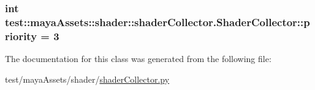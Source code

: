 \hypertarget{classtest_1_1mayaAssets_1_1shader_1_1shaderCollector_1_1ShaderCollector_a2a62ad7ceb3d80d16a917d3177343756}{
\subsubsection[{priority}]{\setlength{\rightskip}{0pt plus 5cm}int {\bf test\-::maya\-Assets\-::shader\-::shader\-Collector.\-Shader\-Collector\-::priority} = 3}}\label{d9/d12/classtest_1_1mayaAssets_1_1shader_1_1shaderCollector_1_1ShaderCollector_a2a62ad7ceb3d80d16a917d3177343756}


\-The documentation for this class was generated from the following file\-:\begin{DoxyCompactItemize}
\item 
test/maya\-Assets/shader/\hyperlink{shaderCollector_8py}{shader\-Collector.\-py}\end{DoxyCompactItemize}

